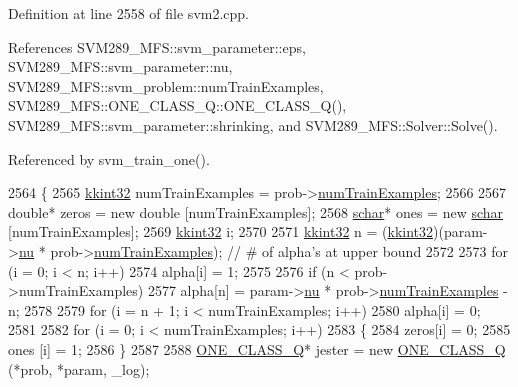 Definition at line 2558 of file svm2.\+cpp.



References S\+V\+M289\+\_\+\+M\+F\+S\+::svm\+\_\+parameter\+::eps, S\+V\+M289\+\_\+\+M\+F\+S\+::svm\+\_\+parameter\+::nu, S\+V\+M289\+\_\+\+M\+F\+S\+::svm\+\_\+problem\+::num\+Train\+Examples, S\+V\+M289\+\_\+\+M\+F\+S\+::\+O\+N\+E\+\_\+\+C\+L\+A\+S\+S\+\_\+\+Q\+::\+O\+N\+E\+\_\+\+C\+L\+A\+S\+S\+\_\+\+Q(), S\+V\+M289\+\_\+\+M\+F\+S\+::svm\+\_\+parameter\+::shrinking, and S\+V\+M289\+\_\+\+M\+F\+S\+::\+Solver\+::\+Solve().



Referenced by svm\+\_\+train\+\_\+one().


\begin{DoxyCode}
2564 \{
2565   \hyperlink{namespace_k_k_b_a8fa4952cc84fda1de4bec1fbdd8d5b1b}{kkint32}  numTrainExamples = prob->\hyperlink{struct_s_v_m289___m_f_s_1_1svm__problem_a16d137e053c79776e064691a20fa80ee}{numTrainExamples};
2566 
2567   \textcolor{keywordtype}{double}*   zeros = \textcolor{keyword}{new} \textcolor{keywordtype}{double} [numTrainExamples];
2568   \hyperlink{namespace_s_v_m289___m_f_s_a27545e8471784d831870feacd3e831ff}{schar}*    ones  = \textcolor{keyword}{new} \hyperlink{namespace_s_v_m289___m_f_s_a27545e8471784d831870feacd3e831ff}{schar}  [numTrainExamples];
2569   \hyperlink{namespace_k_k_b_a8fa4952cc84fda1de4bec1fbdd8d5b1b}{kkint32} i;
2570 
2571   \hyperlink{namespace_k_k_b_a8fa4952cc84fda1de4bec1fbdd8d5b1b}{kkint32} n = (\hyperlink{namespace_k_k_b_a8fa4952cc84fda1de4bec1fbdd8d5b1b}{kkint32})(param->\hyperlink{struct_s_v_m289___m_f_s_1_1svm__parameter_a51d3d06c7a7a38a8c315092f14c3029c}{nu} * prob->\hyperlink{struct_s_v_m289___m_f_s_1_1svm__problem_a16d137e053c79776e064691a20fa80ee}{numTrainExamples});  \textcolor{comment}{// # of
       alpha's at upper bound}
2572 
2573   \textcolor{keywordflow}{for}  (i = 0;  i < n;  i++)
2574     alpha[i] = 1;
2575 
2576   \textcolor{keywordflow}{if}  (n < prob->numTrainExamples)
2577     alpha[n] = param->\hyperlink{struct_s_v_m289___m_f_s_1_1svm__parameter_a51d3d06c7a7a38a8c315092f14c3029c}{nu} * prob->\hyperlink{struct_s_v_m289___m_f_s_1_1svm__problem_a16d137e053c79776e064691a20fa80ee}{numTrainExamples} - n;
2578 
2579   \textcolor{keywordflow}{for}  (i = n + 1;  i < numTrainExamples;  i++)
2580     alpha[i] = 0;
2581 
2582   \textcolor{keywordflow}{for}  (i = 0;  i < numTrainExamples;  i++)
2583   \{
2584     zeros[i] = 0;
2585     ones [i] = 1;
2586   \}
2587 
2588   \hyperlink{class_s_v_m289___m_f_s_1_1_o_n_e___c_l_a_s_s___q}{ONE\_CLASS\_Q}*  jester = \textcolor{keyword}{new} \hyperlink{class_s_v_m289___m_f_s_1_1_o_n_e___c_l_a_s_s___q}{ONE\_CLASS\_Q} (*prob, *param, \_log);

\end{DoxyCode}
